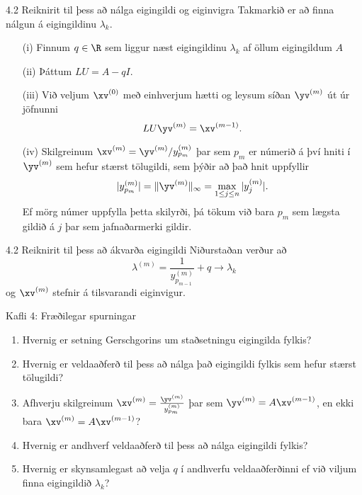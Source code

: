 \begin{frame}{4.2 Reiknirit til þess að nálga eigingildi og eiginvigra} 
Takmarkið er að finna nálgun á eigingildinu $\lambda_k$.  
  \begin{enumerate}
  \item [(i)] Finnum  $q\in \R$ sem liggur næst eigingildinu
    $\lambda_k$ af öllum eigingildum $A$
\pause
  \item [(ii)] Þáttum $LU=A-qI$.
\pause
  \item [(iii)]Við veljum $\xv^{(0)}$ með einhverjum hætti og 
leysum  síðan $\yv^{(m)}$ út úr jöfnunni
$$
LU\yv^{(m)}=\xv^{(m-1)}.
$$
\pause
  \item [(iv)] Skilgreinum
$
\xv^{(m)}={\yv^{(m)}}/{y_{p_m}^{(m)}}
$
þar sem $p_m$ er númerið á því hniti í $\yv^{(m)}$ sem hefur stærst
tölugildi, sem þýðir að það hnit uppfyllir
$$
|y_{p_m}^{(m)}|=\|\yv^{(m)}\|_\infty=\max_{1\leq j\leq n}|y_j^{(m)}|.
$$
Ef mörg númer uppfylla þetta skilyrði, þá tökum við bara $p_m$ sem
lægsta gildið á $j$ þar sem jafnaðarmerki gildir.
  \end{enumerate}
\end{frame}

\begin{frame}{4.2 Reiknirit til þess að ákvarða eigingildi} 
Niðurstaðan verður að 
$$
\lambda^{(m)}=\dfrac 1{y_{p_{m-1}}^{(m)}}+q \to \lambda_k
$$
og $\xv^{(m)}$ stefnir á tilsvarandi eiginvigur.
\end{frame}

\begin{frame}{Kafli 4: Fræðilegar spurningar}

\begin{enumerate}
    \item Hvernig er setning Gerschgorins um staðsetningu
    eigingilda fylkis?
  \item Hvernig er veldaaðferð til þess að nálga það
    eigingildi fylkis sem hefur stærst tölugildi?
  \item Afhverju skilgreinum $\xv^{(m)} = \frac{\yv^{(m)}}{y_{p_m}^{(m)}}$ þar sem
  $\yv^{(m)} = A \xv^{(m-1)}$, en ekki bara $\xv^{(m)} = A \xv^{(m-1)}$?
  \item Hvernig er andhverf veldaaðferð til þess að nálga
    eigingildi fylkis? 
  \item Hvernig er skynsamlegast að velja $q$ í andhverfu veldaaðferðinni ef við viljum
finna eigingildið $\lambda_k$?
\end{enumerate}
\end{frame}


